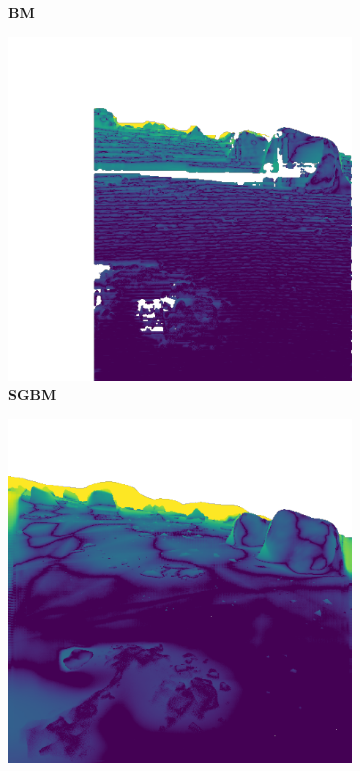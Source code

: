 \begin{figure}[b!]
\begin{subfigure}[b]{0.16\textwidth}
		\caption{\bfseries BM}
	\end{subfigure}\hfill
	\begin{subfigure}[b]{0.16\textwidth}
		\includegraphics[width=\textwidth]{figures/depth_error_SGBM.png}
		\caption{\bfseries SGBM}
	\end{subfigure}\hfill
	\begin{subfigure}[b]{0.16\textwidth}
		\includegraphics[width=\textwidth]{figures/depth_error_RAFTStereo.png}

\end{subfigure}
\end{figure}
